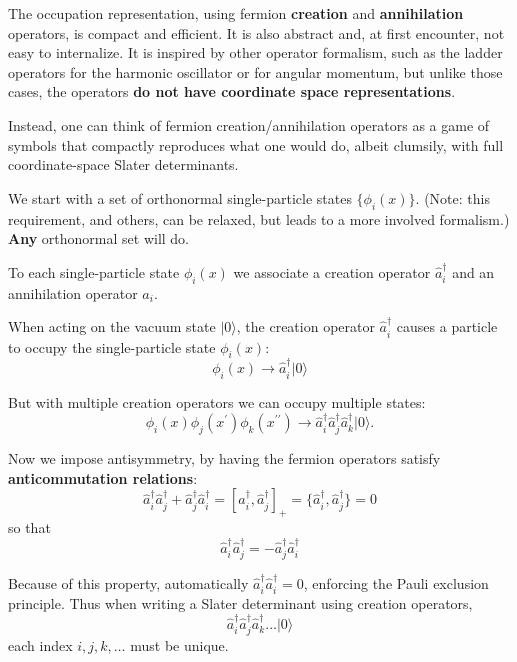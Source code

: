 The occupation representation, using fermion \textbf{creation}
and \textbf{annihilation} operators, is compact and efficient. It is
also abstract and, at first encounter, not easy to internalize. It is
inspired by other operator formalism, such as the ladder operators for
the harmonic oscillator or for angular momentum, but unlike those
cases, the operators \textbf{do not have coordinate space
representations}.

Instead, one can think of fermion creation/annihilation operators as a
game of symbols that compactly reproduces what one would do, albeit
clumsily, with full coordinate-space Slater determinants.



We start with a set of orthonormal single-particle states
$\{ \phi_i(x) \}$.  (Note: this requirement, and others, can be
relaxed, but leads to a more involved formalism.) \textbf{Any}
orthonormal set will do.

To each single-particle state $\phi_i(x)$ we associate a creation operator 
$\hat{a}^\dagger_i$ and an annihilation operator $\hat{a}_i$. 

When acting on the vacuum state $| 0 \rangle$, the creation operator $\hat{a}^\dagger_i$ causes 
a particle to occupy the single-particle state $\phi_i(x)$:
\[
\phi_i(x) \rightarrow \hat{a}^\dagger_i |0 \rangle
\]



But with multiple creation operators we can occupy multiple states:
\[
\phi_i(x) \phi_j(x^\prime) \phi_k(x^{\prime \prime}) 
\rightarrow \hat{a}^\dagger_i \hat{a}^\dagger_j \hat{a}^\dagger_k |0 \rangle.
\]

Now we impose antisymmetry, by having the fermion operators satisfy  \textbf{anticommutation relations}:
\[
\hat{a}^\dagger_i \hat{a}^\dagger_j + \hat{a}^\dagger_j \hat{a}^\dagger_i
= [ \hat{a}^\dagger_i ,\hat{a}^\dagger_j ]_+ 
= \{ \hat{a}^\dagger_i ,\hat{a}^\dagger_j \} = 0
\]
so that 
\[
\hat{a}^\dagger_i \hat{a}^\dagger_j = - \hat{a}^\dagger_j \hat{a}^\dagger_i
\]




Because of this property, automatically $\hat{a}^\dagger_i \hat{a}^\dagger_i = 0$, 
enforcing the Pauli exclusion principle.  Thus when writing a Slater determinant 
using creation operators, 
\[
\hat{a}^\dagger_i \hat{a}^\dagger_j \hat{a}^\dagger_k \ldots |0 \rangle
\]
each index $i,j,k, \ldots$ must be unique.





